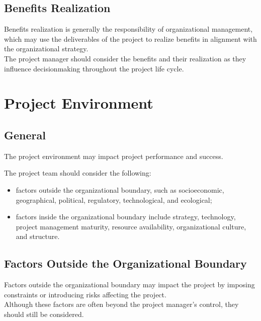 \documentclass[letterpaper,10pt,english]{jupyterBook}
\begin{document}
\subsection{Benefits Realization}
\label{\detokenize{PM/pm-concepts:benefits-realization}}
\sphinxAtStartPar
Benefits realization is generally the responsibility of organizational management, which may use the deliverables of the project to realize benefits in alignment with the organizational strategy. \\
The project manager should consider the benefits and their realization as they influence decision\sphinxhyphen{}making throughout the project life cycle.


\section{Project Environment}
\label{\detokenize{PM/pm-concepts:project-environment}}

\subsection{General}
\label{\detokenize{PM/pm-concepts:general}}
\sphinxAtStartPar
The project environment may impact project performance and success.

\sphinxAtStartPar
The project team should consider the following:
\begin{itemize}
\item {} 
\sphinxAtStartPar
factors outside the organizational boundary, such as socio\sphinxhyphen{}economic, geographical, political, regulatory, technological, and ecological;

\item {} 
\sphinxAtStartPar
factors inside the organizational boundary include strategy, technology, project management maturity, resource availability, organizational culture, and structure.

\end{itemize}


\subsection{Factors Outside the Organizational Boundary}
\label{\detokenize{PM/pm-concepts:factors-outside-the-organizational-boundary}}
\sphinxAtStartPar
Factors outside the organizational boundary may impact the project by imposing constraints or introducing risks affecting the project. \\
Although these factors are often beyond the project manager’s control, they should still be considered.
\end{document}
